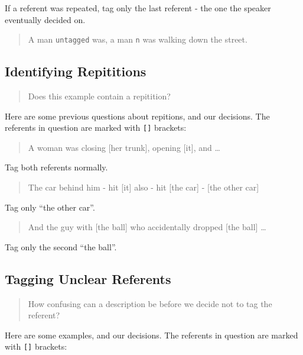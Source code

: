 \documentclass[
]{book}
\begin{document}
If a referent was repeated, tag only the last referent - the one the speaker eventually decided on.

\begin{quote}
A man \texttt{untagged} was, a man \texttt{n} was walking down the street.
\end{quote}

\hypertarget{identifying-repititions}{%
\subsection{Identifying Repititions}\label{identifying-repititions}}

\begin{quote}
Does this example contain a repitition?
\end{quote}

Here are some previous questions about repitions, and our decisions.
The referents in question are marked with \texttt{{[}{]}} brackets:

\begin{quote}
A woman was closing {[}her trunk{]}, opening {[}it{]}, and \ldots{}
\end{quote}

Tag both referents normally.

\begin{quote}
The car behind him - hit {[}it{]} also - hit {[}the car{]} - {[}the other car{]}
\end{quote}

Tag only ``the other car''.

\begin{quote}
And the guy with {[}the ball{]} who accidentally dropped {[}the ball{]} \ldots{}
\end{quote}

Tag only the second ``the ball''.

\hypertarget{tagging-unclear-referents}{%
\subsection{Tagging Unclear Referents}\label{tagging-unclear-referents}}

\begin{quote}
How confusing can a description be before we decide not to tag the referent?
\end{quote}

Here are some examples, and our decisions.
The referents in question are marked with \texttt{{[}{]}} brackets:
\end{document}

